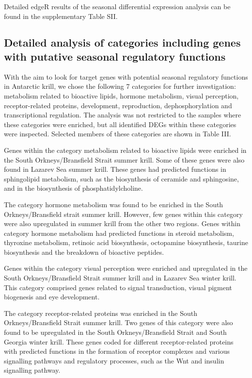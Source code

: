 Detailed edgeR results of the seasonal differential expression analysis can be
found in the supplementary Table SII.

\subsection{Detailed analysis of categories including genes with putative seasonal regulatory functions}

With the aim to look for target genes with potential seasonal regulatory
functions in Antarctic krill, we chose the following 7 categories for further
investigation: metabolism related to bioactive lipids, hormone metabolism,
visual perception, receptor-related proteins, development, reproduction,
dephosphorylation and transcriptional regulation. The analysis was not
restricted to the samples where these categories were enriched, but all
identified DEGs within these categories were inspected. Selected members of
these categories are shown in Table III. 

Genes within the category metabolism related to bioactive lipids were enriched
in the South Orkneys/Bransfield Strait summer krill. Some of these genes were
also found in Lazarev Sea summer krill. These genes had predicted functions in
sphingolipid metabolism, such as the biosynthesis of ceramide and sphingosine,
and in the biosynthesis of phosphatidylcholine.

The category hormone metabolism was found to be enriched in the South
Orkneys/Bransfield strait summer krill. However, few genes within this category
were also upregulated in summer krill from the other two regions. Genes within
category hormone metabolism had predicted functions in steroid metabolism,
thyroxine metabolism, retinoic acid biosynthesis, octopamine biosynthesis,
taurine biosynthesis and the breakdown of bioactive peptides.

Genes within the category visual perception were enriched and upregulated in
the South Orkneys/Bransfield Strait summer krill and in Lazarev Sea winter
krill. This category comprised genes related to signal transduction, visual
pigment biogenesis and eye development.

The category receptor-related proteins was enriched in the South
Orkneys/Bransfield Strait summer krill. Two genes of this category were also
found to be upregulated in the South Orkneys/Bransfield Strait and South
Georgia winter krill. These genes coded for different receptor-related proteins
with predicted functions in the formation of receptor complexes and various
signalling pathways and regulatory processes, such as the Wnt and insulin
signalling pathway.

